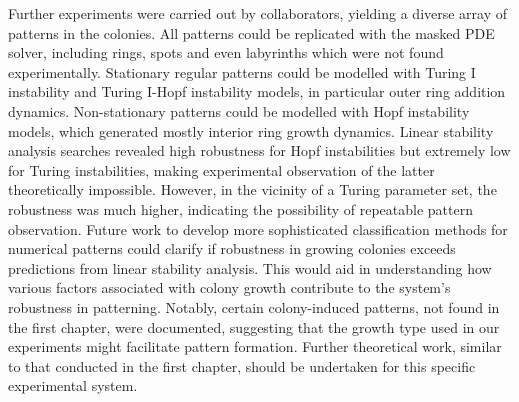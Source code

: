 Further experiments were carried out by collaborators, yielding a diverse array of patterns in the colonies.
All patterns could be replicated with the masked PDE solver, including rings, spots and even labyrinths which were not found experimentally.
Stationary regular patterns could be modelled with Turing I instability and Turing I-Hopf instability models, in particular outer ring addition dynamics.
Non-stationary patterns could be modelled with Hopf instability models, which generated mostly interior ring growth dynamics.
Linear stability analysis searches revealed high robustness for Hopf instabilities but extremely low for Turing instabilities, making experimental observation of the latter theoretically impossible.
However, in the vicinity of a Turing parameter set, the robustness was much higher, indicating the possibility of repeatable pattern observation.
Future work to develop more sophisticated classification methods for numerical patterns could clarify if robustness in growing colonies exceeds predictions from linear stability analysis.
This would aid in understanding how various factors associated with colony growth contribute to the system's robustness in patterning.
Notably, certain colony-induced patterns, not found in the first chapter, were documented, suggesting that the growth type used in our experiments might facilitate pattern formation.
Further theoretical work, similar to that conducted in the first chapter, should be undertaken for this specific experimental system.


